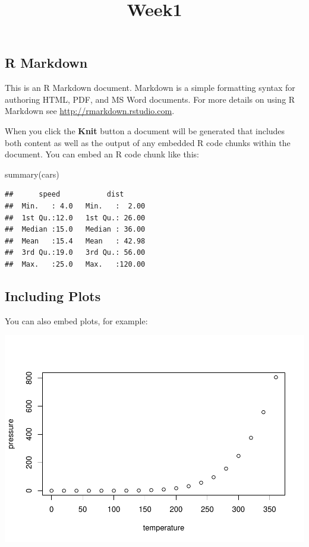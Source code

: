 \documentclass[
]{article}
\title{Week1}
\author{}
\date{\vspace{-2.5em}}
\newenvironment{Shaded}{\begin{snugshade}}{\end{snugshade}}
\newcommand{\FunctionTok}[1]{\textcolor[rgb]{0.00,0.00,0.00}{#1}}
\newcommand{\NormalTok}[1]{#1}
\begin{document}
\maketitle

\hypertarget{r-markdown}{%
\subsection{R Markdown}\label{r-markdown}}

This is an R Markdown document. Markdown is a simple formatting syntax
for authoring HTML, PDF, and MS Word documents. For more details on
using R Markdown see \url{http://rmarkdown.rstudio.com}.

When you click the \textbf{Knit} button a document will be generated
that includes both content as well as the output of any embedded R code
chunks within the document. You can embed an R code chunk like this:

\begin{Shaded}
\begin{Highlighting}[]
\FunctionTok{summary}\NormalTok{(cars)}
\end{Highlighting}
\end{Shaded}

\begin{verbatim}
##      speed           dist       
##  Min.   : 4.0   Min.   :  2.00  
##  1st Qu.:12.0   1st Qu.: 26.00  
##  Median :15.0   Median : 36.00  
##  Mean   :15.4   Mean   : 42.98  
##  3rd Qu.:19.0   3rd Qu.: 56.00  
##  Max.   :25.0   Max.   :120.00
\end{verbatim}

\hypertarget{including-plots}{%
\subsection{Including Plots}\label{including-plots}}

You can also embed plots, for example:

\includegraphics{week1_practice_files/figure-latex/pressure-1.pdf}
\end{document}
